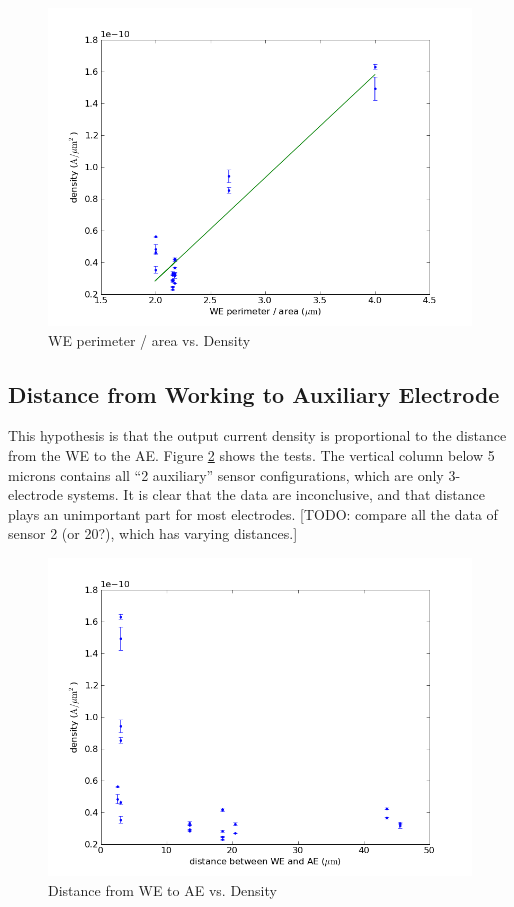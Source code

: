\begin{figure}
	\centering
	\includegraphics[width=0.7\linewidth]{figures/perim_area_v_density.png}
	\caption{WE perimeter / area vs. Density}
	\label{perim_area_v_density}
\end{figure}

\subsection{Distance from Working to Auxiliary Electrode}

This hypothesis is that the output current density is proportional to the distance from the WE to the AE. Figure \ref{distance_v_density} shows the tests. The vertical column below 5 microns contains all ``2 auxiliary'' sensor configurations, which are only 3-electrode systems. It is clear that the data are inconclusive, and that distance plays an unimportant part for most electrodes. [TODO: compare all the data of sensor 2 (or 20?), which has varying distances.]

\begin{figure}
	\centering
	\includegraphics[width=0.7\linewidth]{figures/distance_v_density.png}
	\caption{Distance from WE to AE vs. Density}
	\label{distance_v_density}
\end{figure}

